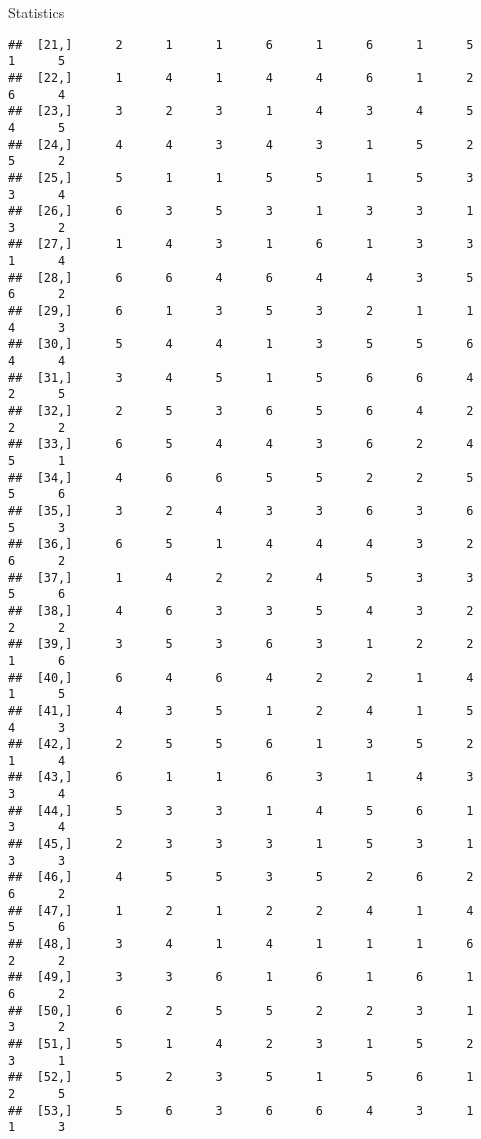\documentclass[
  ignorenonframetext,
]{beamer}
\begin{document}
\begin{frame}[fragile]{Statistics}
\begin{verbatim}
##  [21,]      2      1      1      6      1      6      1      5      1      5
##  [22,]      1      4      1      4      4      6      1      2      6      4
##  [23,]      3      2      3      1      4      3      4      5      4      5
##  [24,]      4      4      3      4      3      1      5      2      5      2
##  [25,]      5      1      1      5      5      1      5      3      3      4
##  [26,]      6      3      5      3      1      3      3      1      3      2
##  [27,]      1      4      3      1      6      1      3      3      1      4
##  [28,]      6      6      4      6      4      4      3      5      6      2
##  [29,]      6      1      3      5      3      2      1      1      4      3
##  [30,]      5      4      4      1      3      5      5      6      4      4
##  [31,]      3      4      5      1      5      6      6      4      2      5
##  [32,]      2      5      3      6      5      6      4      2      2      2
##  [33,]      6      5      4      4      3      6      2      4      5      1
##  [34,]      4      6      6      5      5      2      2      5      5      6
##  [35,]      3      2      4      3      3      6      3      6      5      3
##  [36,]      6      5      1      4      4      4      3      2      6      2
##  [37,]      1      4      2      2      4      5      3      3      5      6
##  [38,]      4      6      3      3      5      4      3      2      2      2
##  [39,]      3      5      3      6      3      1      2      2      1      6
##  [40,]      6      4      6      4      2      2      1      4      1      5
##  [41,]      4      3      5      1      2      4      1      5      4      3
##  [42,]      2      5      5      6      1      3      5      2      1      4
##  [43,]      6      1      1      6      3      1      4      3      3      4
##  [44,]      5      3      3      1      4      5      6      1      3      4
##  [45,]      2      3      3      3      1      5      3      1      3      3
##  [46,]      4      5      5      3      5      2      6      2      6      2
##  [47,]      1      2      1      2      2      4      1      4      5      6
##  [48,]      3      4      1      4      1      1      1      6      2      2
##  [49,]      3      3      6      1      6      1      6      1      6      2
##  [50,]      6      2      5      5      2      2      3      1      3      2
##  [51,]      5      1      4      2      3      1      5      2      3      1
##  [52,]      5      2      3      5      1      5      6      1      2      5
##  [53,]      5      6      3      6      6      4      3      1      1      3

\end{verbatim}
\end{frame}
\end{document}
